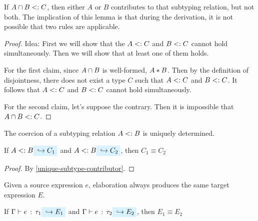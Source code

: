 \documentclass[preprint]{sigplanconf}
\begin{document}
If $A \cap B <: C$, then either $A$ or $B$ contributes to that subtyping relation, but not both. The implication of this lemma is that during the derivation, it is not possible that two rules are applicable.

\begin{proof}
Idea: First we will show that the $A <: C$ and $B <: C$ cannot hold simultaneously. Then we will show that at least one of them holds.

For the first claim, since $A \cap B$ is well-formed, $A * B$. Then by the definition of disjointness, there does not exist a type $C$ such that $A <: C$ and $B <: C$. It follows that $A <: C$ and $B <: C$ cannot hold simultaneously.

For the second claim, let's suppose the contrary. Then it is impossible that $A \cap B <: C$.
\end{proof}

The coercion of a subtyping relation $A <: B$ is uniquely determined.

\begin{lemma} \label{unique-coercion}
If $A \subtype B \yields {C_1}$ and $A \subtype B \yields {C_2}$, then $C_1 \equiv C_2$
\end{lemma}

\begin{proof}
By \ref{unique-subtype-contributor}.
\end{proof}

Given a source expression $e$, elaboration always produces the same target expression $E$.

\begin{theorem} \label{unique-elaboration}
If $\hastype \Gamma e {\tau_1} \yields {E_1}$ and $\hastype \Gamma e {\tau_2} \yields {E_2}$, then $E_1 \equiv E_2$
\end{theorem}
\end{document}
